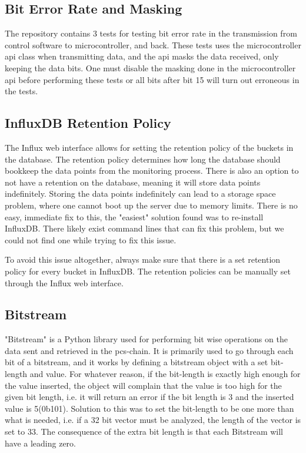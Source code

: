 \documentclass[main.tex]{subfiles}
\begin{document}
\subsection{Bit Error Rate and Masking}

The repository contains 3 tests for testing bit error rate in the transmission from control software to microcontroller, and back. These tests uses the microcontroller \gls{api} class when transmitting data, and the \gls{api} masks the data received, only keeping the data bits. One must disable the masking done in the microcontroller \gls{api} before performing these tests or all bits after bit 15 will turn out erroneous in the tests.

\subsection{InfluxDB Retention Policy}

The Influx web interface allows for setting the retention policy of the buckets in the database. The retention policy determines how long the database should bookkeep the data points from the monitoring process. There is also an option to not have a retention on the database, meaning it will store data points indefinitely. Storing the data points indefinitely can lead to a storage space problem, where one cannot boot up the server due to memory limits. There is no easy, immediate fix to this, the "easiest" solution found was to re-install InfluxDB. There likely exist command lines that can fix this problem, but we could not find one while trying to fix this issue.

To avoid this issue altogether, always make sure that there is a set retention policy for every bucket in InfluxDB. The retention policies can be manually set through the Influx web interface.

\subsection{Bitstream}

"Bitstream" is a Python library used for performing bit wise operations on the data sent and retrieved in the \gls{pcs}-chain. It is primarily used to go through each bit of a bitstream, and it works by defining a bitstream object with a set bit-length and value. For whatever reason, if the bit-length is exactly high enough for the value inserted, the object will complain that the value is too high for the given bit length, i.e. it will return an error if the bit length is 3 and the inserted value is 5(0b101). Solution to this was to set the bit-length to be one more than what is needed, i.e. if a 32 bit vector must be analyzed, the length of the vector is set to 33. The consequence of the extra bit length is that each Bitstream will have a leading zero.
\end{document}

